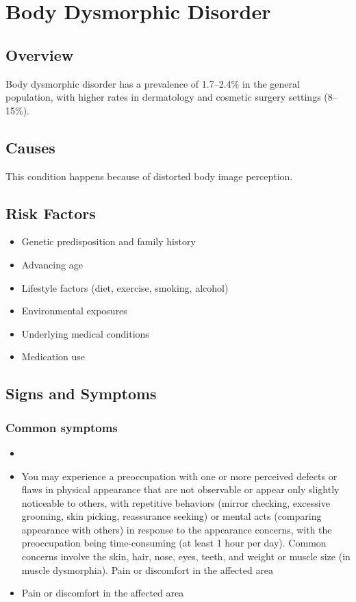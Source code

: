 \chapter{Body Dysmorphic Disorder}
\label{sec:Body Dysmorphic Disorder}

\section{Overview}
Body dysmorphic disorder has a prevalence of 1.7--2.4\% in the general population, with higher rates in dermatology and cosmetic surgery settings (8--15\%).
\section{Causes}
This condition happens because of distorted body image perception.     
\section{Risk Factors}

\begin{itemize}[noitemsep]
  \item Genetic predisposition and family history
  \item Advancing age
  \item Lifestyle factors (diet, exercise, smoking, alcohol)
  \item Environmental exposures
  \item Underlying medical conditions
  \item Medication use
\end{itemize}
\section{Signs and Symptoms}

\subsection{Common symptoms}
\begin{itemize}[noitemsep]
  \item \item You may experience a preoccupation with one or more perceived defects or flaws in physical appearance that are not observable or appear only slightly noticeable to others, with repetitive behaviors (mirror checking, excessive grooming, skin picking, reassurance seeking) or mental acts (comparing appearance with others) in response to the appearance concerns, with the preoccupation being time-consuming (at least 1 hour per day). Common concerns involve the skin, hair, nose, eyes, teeth, and weight or muscle size (in muscle dysmorphia). Pain or discomfort in the affected area    \item Pain or discomfort in the affected area
  \end{itemize}

